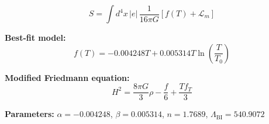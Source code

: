 
\begin{equation}
  S = \int d^4x \, |e| \, \frac{1}{16\pi G} \left[ f(T) + \mathcal{L}_m \right]
\end{equation}

\textbf{Best-fit model:}
\begin{equation}
  f(T) = -0.004248 T + 0.005314 T \ln\!\left(\frac{T}{T_0}\right)
\end{equation}

\textbf{Modified Friedmann equation:}
\begin{equation}
  H^2 = \frac{8\pi G}{3} \rho - \frac{f}{6} + \frac{T f_T}{3}
\end{equation}

\textbf{Parameters:}
$\alpha = -0.004248$, \quad
$\beta = 0.005314$, \quad
$n = 1.7689$, \quad
$\Lambda_{\text{BI}} = 540.9072$